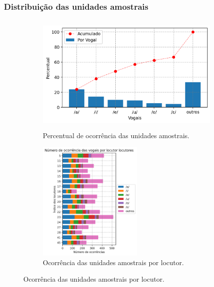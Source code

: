 \documentclass[121pt, aspectratio=169, t]{beamer}
\begin{document}
\begin{frame}[fragile=singleslide]
	\frametitle{Distribuição das unidades amostrais}
	\begin{figure}
		\centering
		\begin{subfigure}[t]{8.5cm}
			\includegraphics[height=5.9cm]{Vowels_Count.png}
			\caption{Percentual de ocorrência das unidades amostrais.}
		\end{subfigure}
		\hfill
		\begin{subfigure}[t]{4.75cm}
			\centering
			\includegraphics[height=5.9cm]{PLT_01_Sons_Contexto.png}
			\caption{Ocorrência das unidades amostrais por locutor.}
		\end{subfigure}
	\end{figure}



\end{frame}
\end{document}
